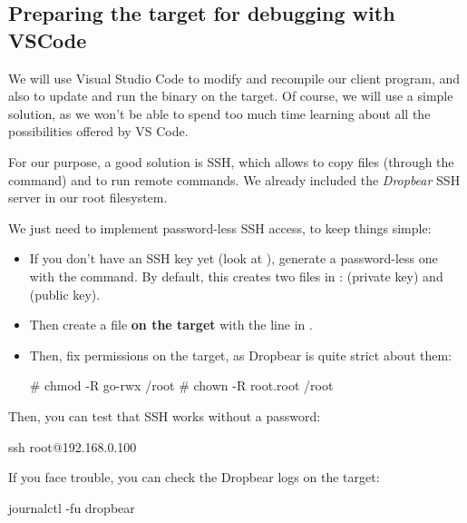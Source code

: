 
\subsection{Preparing the target for debugging with VSCode}

We will use Visual Studio Code to modify and recompile our client
program, and also to update and run the binary on the target.
Of course, we will use a simple solution, as we won't be able to
spend too much time learning about all the possibilities offered
by VS Code.

For our purpose, a good solution is SSH, which allows to copy files
(through the  command) and to run remote commands. We already
included the {\em Dropbear} SSH server in our root filesystem.

We just need to implement password-less SSH access, to keep things
simple:

\begin{itemize}
  \item If you don't have an SSH key yet (look at ),
	generate a password-less one with the  command.
	By default, this creates two files in :
	 (private key) and  (public key).
  \item Then create a  file {\bf on the target}
        with the line in .
  \item Then, fix permissions on the target, as Dropbear is quite strict
        about them:
        \begin{bashinput}
# chmod -R go-rwx /root
# chown -R root.root /root
        \end{bashinput}
\end{itemize}

Then, you can test that SSH works without a password:

\begin{bashinput}
ssh root@192.168.0.100
\end{bashinput}

If you face trouble, you can check the Dropbear logs on the target:

\begin{bashinput}
journalctl -fu dropbear
\end{bashinput}

